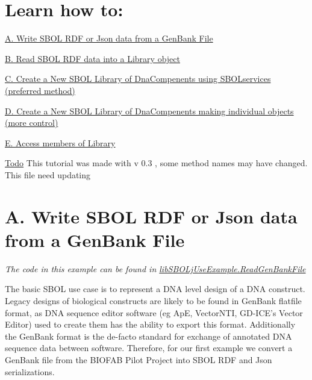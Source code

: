 \hypertarget{tutorial_sec_toc}{}\section{Learn how to:}\label{tutorial_sec_toc}
\hyperlink{tutorial_A}{A. Write SBOL RDF or Json data from a GenBank File} \par
 \hyperlink{tutorial_B}{B. Read SBOL RDF data into a Library object} \par
 \hyperlink{tutorial_C}{C. Create a New SBOL Library of DnaCompenents using SBOLservices (preferred method)} \par
 \hyperlink{tutorial_D}{D. Create a New SBOL Library of DnaCompenents making individual objects (more control)} \par
 \hyperlink{tutorial_E}{E. Access members of Library} \par


\begin{Desc}
\item[\hyperlink{todo__todo000011}{Todo}]This tutorial was made with v 0.3 , some method names may have changed. This file need updating\end{Desc}




\hypertarget{tutorial_A}{}\section{A. Write SBOL RDF or Json data from a GenBank File}\label{tutorial_A}
{\itshape The code in this example can be found in \hyperlink{classlib_s_b_o_lj_use_example_1_1_read_gen_bank_file}{libSBOLjUseExample.ReadGenBankFile}\/}

The basic SBOL use case is to represent a DNA level design of a DNA construct. Legacy designs of biological constructs are likely to be found in GenBank flatfile format, as DNA sequence editor software (eg ApE, VectorNTI, GD-\/ICE's Vector Editor) used to create them has the ability to export this format. Additionally the GenBank format is the de-\/facto standard for exchange of annotated DNA sequence data between software. Therefore, for our first example we convert a GenBank file from the BIOFAB Pilot Project into SBOL RDF and Json serializations.


